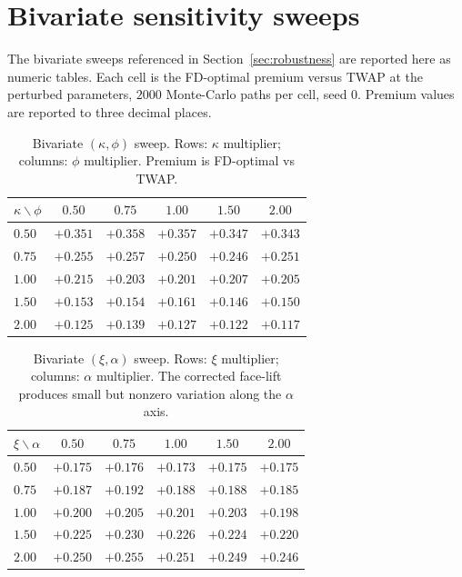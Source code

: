 \documentclass[]{interact}
\theoremstyle{plain}
\theoremstyle{definition}
\theoremstyle{remark}
\newcommand{\1}[1]{\mathbf{1}_{\{#1\}}}
\begin{document}
\section{Bivariate sensitivity sweeps}\label{app:bivariate}

The bivariate sweeps referenced in Section~\ref{sec:robustness} are reported here as numeric tables. Each cell is the FD-optimal premium versus TWAP at the perturbed parameters, $2000$ Monte-Carlo paths per cell, seed $0$. Premium values are reported to three decimal places.

\begin{table}[h]
\centering
\caption{Bivariate $(\kappa, \phi)$ sweep. Rows: $\kappa$ multiplier; columns: $\phi$ multiplier. Premium is FD-optimal vs TWAP.}
\label{tab:appB-kphi}
\begin{tabular}{@{}lccccc@{}}
\toprule
$\kappa \backslash \phi$ & $0.50$ & $0.75$ & $1.00$ & $1.50$ & $2.00$ \\
\midrule
$0.50$ & $+0.351$ & $+0.358$ & $+0.357$ & $+0.347$ & $+0.343$ \\
$0.75$ & $+0.255$ & $+0.257$ & $+0.250$ & $+0.246$ & $+0.251$ \\
$1.00$ & $+0.215$ & $+0.203$ & $+0.201$ & $+0.207$ & $+0.205$ \\
$1.50$ & $+0.153$ & $+0.154$ & $+0.161$ & $+0.146$ & $+0.150$ \\
$2.00$ & $+0.125$ & $+0.139$ & $+0.127$ & $+0.122$ & $+0.117$ \\
\bottomrule
\end{tabular}
\end{table}

\begin{table}[h]
\centering
\caption{Bivariate $(\xi, \alpha)$ sweep. Rows: $\xi$ multiplier; columns: $\alpha$ multiplier. The corrected face-lift produces small but nonzero variation along the $\alpha$ axis.}
\label{tab:appB-xialpha}
\begin{tabular}{@{}lccccc@{}}
\toprule
$\xi \backslash \alpha$ & $0.50$ & $0.75$ & $1.00$ & $1.50$ & $2.00$ \\
\midrule
$0.50$ & $+0.175$ & $+0.176$ & $+0.173$ & $+0.175$ & $+0.175$ \\
$0.75$ & $+0.187$ & $+0.192$ & $+0.188$ & $+0.188$ & $+0.185$ \\
$1.00$ & $+0.200$ & $+0.205$ & $+0.201$ & $+0.203$ & $+0.198$ \\
$1.50$ & $+0.225$ & $+0.230$ & $+0.226$ & $+0.224$ & $+0.220$ \\
$2.00$ & $+0.250$ & $+0.255$ & $+0.251$ & $+0.249$ & $+0.246$ \\
\bottomrule
\end{tabular}
\end{table}
\end{document}
